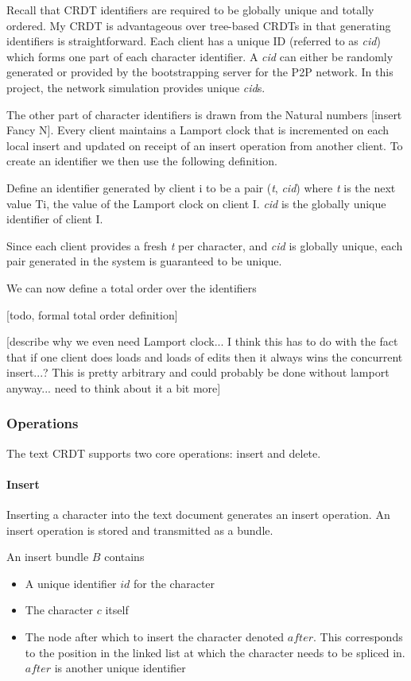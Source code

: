 \documentclass[12pt,a4paper,twoside,openright]{report}
\begin{document}
		Recall that CRDT identifiers are required to be globally unique and totally ordered. My CRDT is advantageous over tree-based CRDTs in that generating identifiers is straightforward. Each client has a unique ID (referred to as \textit{cid}) which forms one part of each character identifier. A \textit{cid} can either be randomly generated or provided by the bootstrapping server for the P2P network. In this project, the network simulation provides unique \textit{cid}s.
		
		The other part of character identifiers is drawn from the Natural numbers [insert Fancy N]. Every client maintains a Lamport \cite{lamport1978} clock that is incremented on each local insert and updated on receipt of an insert operation from another client. To create an identifier we then use the following definition.
		
		Define an identifier generated by client i to be a pair (\textit{t}, \textit{cid}) where \textit{t} is the next value Ti, the value of the Lamport clock on client I. \textit{cid} is the globally unique identifier of client I.
		
		Since each client provides a fresh \textit{t} per character, and \textit{cid} is globally unique, each pair generated in the system is guaranteed to be unique.
		
		We can now define a total order over the identifiers
		
		[todo, formal total order definition]
		
		[describe why we even need Lamport clock... I think this has to do with the fact that if one client does loads and loads of edits then it always wins the concurrent insert...? This is pretty arbitrary and could probably be done without lamport anyway... need to think about it a bit more]
		
		
		\subsubsection{Operations}
		The text CRDT supports two core operations: insert and delete.
		
			\paragraph{Insert}
				Inserting a character into the text document generates an insert operation. An insert operation is stored and transmitted as a bundle.
				
				An insert bundle $B$ contains
				\begin{itemize}
					\item A unique identifier $id$ for the character
					\item The character $c$ itself
					\item The node after which to insert the character denoted $after$. This corresponds to the position in the linked list at which the character needs to be spliced in. $after$ is another unique identifier
				\end{itemize}
			
\end{document}
